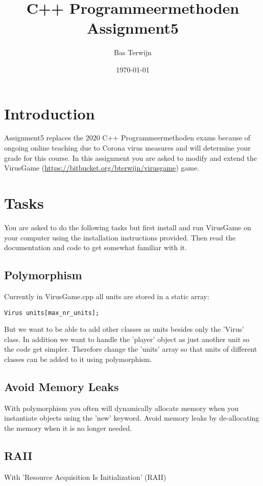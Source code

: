\documentclass[12pt]{article}
\title{C++ Programmeermethoden Assignment5}
\author{Bas Terwijn}
\date{\today}
\begin{document}
\maketitle

\section{Introduction}
Assignment5 replaces the 2020 C++ Programmeermethoden exams because of
ongoing online teaching due to Corona virus measures and will
determine your grade for this course. In this assignment you are asked
to modify and extend the VirusGame
(\url{https://bitbucket.org/bterwijn/virusgame}) game.

\section{Tasks}
You are asked to do the following tasks but first install and run
VirusGame on your computer using the installation instructions
provided. Then read the documentation and code to get somewhat
familiar with it.

\subsection{Polymorphism}
Currently in VirusGame.cpp all units are stored in a static array:

\begin{tcolorbox}
\begin{verbatim}
Virus units[max_nr_units];
\end{verbatim}
\end{tcolorbox}

But we want to be able to add other classes as units besides only the
'Virus' class. In addition we want to handle the 'player' object as
just another unit so the code get simpler. Therefore change the
'units' array so that units of different classes can be added to it
using polymorphism.

\subsection{Avoid Memory Leaks}
With polymorphism you often will dynamically allocate memory when you
instantiate objects using the 'new' keyword. Avoid memory leaks by
de-allocating the memory when it is no longer needed.

\subsection{RAII}
With 'Resource Acquisition Is Initialization' (RAII)
\end{document}
